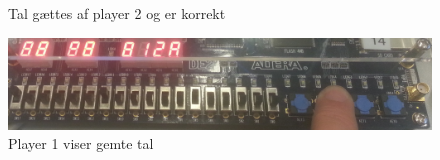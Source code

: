\begin{enumerate}
\begin{figure}[h]
			\caption{Tal gættes af player 2 og er korrekt}
			\label{fig:Guess2pTryOk}
		\end{figure}
		\begin{figure}[h!]
			\centering
			\includegraphics[scale=0.10]{pictures/Oevelse5/opg3/guess_2p_show.JPG}
			\caption{Player 1 viser gemte tal}
			\label{fig:Guess2pShow}
		\end{figure}
\end{enumerate}
\clearpage